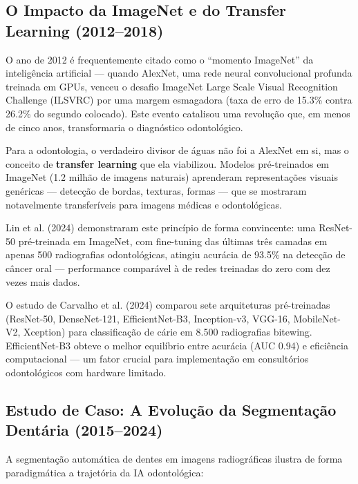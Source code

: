 \subsection{O Impacto da ImageNet e do Transfer Learning (2012--2018)}

O ano de 2012 é frequentemente citado como o ``momento ImageNet'' da inteligência artificial — quando AlexNet, uma rede neural convolucional profunda treinada em GPUs, venceu o desafio ImageNet Large Scale Visual Recognition Challenge (ILSVRC) por uma margem esmagadora (taxa de erro de 15.3\% contra 26.2\% do segundo colocado). Este evento catalisou uma revolução que, em menos de cinco anos, transformaria o diagnóstico odontológico.

Para a odontologia, o verdadeiro divisor de águas não foi a AlexNet em si, mas o conceito de \textbf{transfer learning} que ela viabilizou. Modelos pré-treinados em ImageNet (1.2 milhão de imagens naturais) aprenderam representações visuais genéricas — detecção de bordas, texturas, formas — que se mostraram notavelmente transferíveis para imagens médicas e odontológicas.

Lin et al. (2024) \cite{ODT-026} demonstraram este princípio de forma convincente: uma ResNet-50 pré-treinada em ImageNet, com fine-tuning das últimas três camadas em apenas 500 radiografias odontológicas, atingiu acurácia de 93.5\% na detecção de câncer oral — performance comparável à de redes treinadas do zero com dez vezes mais dados.

O estudo de Carvalho et al. (2024) \cite{ODT-022} comparou sete arquiteturas pré-treinadas (ResNet-50, DenseNet-121, EfficientNet-B3, Inception-v3, VGG-16, MobileNet-V2, Xception) para classificação de cárie em 8.500 radiografias bitewing. EfficientNet-B3 obteve o melhor equilíbrio entre acurácia (AUC 0.94) e eficiência computacional — um fator crucial para implementação em consultórios odontológicos com hardware limitado.

\subsection{Estudo de Caso: A Evolução da Segmentação Dentária (2015--2024)}

A segmentação automática de dentes em imagens radiográficas ilustra de forma paradigmática a trajetória da IA odontológica:

